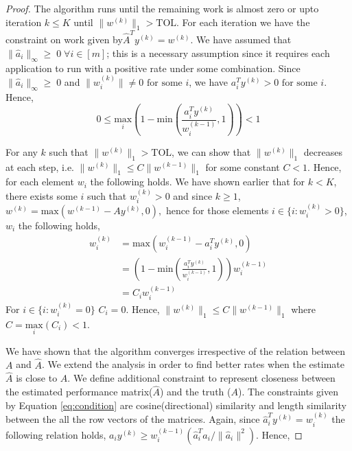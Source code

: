 \begin{proof}
The algorithm runs  until the remaining work is almost zero or upto iteration $k \leq K$ until $\|w^{(k)}\|_1 >\text{TOL}$. For each iteration we have the constraint on work given by$\hat{A}^T y^{(k)} = w^{(k)}$. We have assumed that $\|\hat{a}_i\|_{\infty} \geq \; 0 \; \forall i \in [m]$; this is a necessary assumption since it requires each application to run with a positive rate under some combination.  Since $\|\hat{a}_i\|_{\infty} \geq \; 0$ and $\|w_i^{(k)}\| \neq 0 \text{ for some } i $, we have $a_i^T y^{(k)} >0 \text{ for some }i$. Hence,
\begin{equation}
0\leq \underset{i}{\mathrm{max}} \left(1-\text{min}\left(\frac{a_i^T y^{(k)}}{w_i^{(k-1)} },1\right) \right) < 1
\label{eq:constant1}
\end{equation}

For any $k$ such that $\|w^{(k)}\|_1 > \text{TOL}$, we can show that $\|w^{(k)}\|_1$ decreases at each step, i.e. $\|w^{(k)}\|_1 \leq C \|w^{(k-1)}\|_1$ for some constant $C < 1$. Hence, for each element $w_i$ the following holds. We have shown earlier that for $k<K$, there exists some $i$ such that $w_i^{(k)} >0$ and since $k\geq 1$, $	w^{(k)} =\text{max}(w^{(k-1)} -  A y^{(k)},0),$ hence for those elements $i \in \{i:w^{(k)}_i>0\}$, $w_i$ the following holds,
	\begin{align*} 
		 w_i^{(k)} & = \text{max}(w_i^{(k-1)} -  a_i^T y^{(k)},0)\\ 		 
		 &=  \left(1 - \text{min}\left(\frac{a_i^T y^{(k)}}{w_i^{(k-1)} },1\right) \right)w_i^{(k-1)}\\
		 &= C_{i} w_i^{(k-1)} 
	\end{align*}   
For $i \in \{i:w^{(k)}_i=0\}$ $C_{i}=0$. Hence, $\|w^{(k)}\|_1 \leq C \|w^{(k-1)}\|_1  $ where $C =  \underset{i}{\mathrm{max}} (C_{i}) <1$.

We have shown that the algorithm converges irrespective of the relation between $A$ and $\hat{A}$. We extend the analysis in order to find better rates when the estimate $\hat{A}$ is close to $A$. We define additional constraint to represent closeness between the estimated performance matrix($\hat{A}$) and the truth ($A$). The constraints given by Equation \eqref{eq:condition} are cosine(directional) similarity and length similarity between the all the row vectors of the matrices.
Again, since $\hat{a}_i^T y^{(k)} = w_i^{(k)}$ the following relation holds, $a_iy^{(k)}  \geq w_i^{(k-1)} \left( \hat{a}_i^{T} a_i /\|\hat{a}_i\|^2 \right)$. Hence, 


\end{proof}
